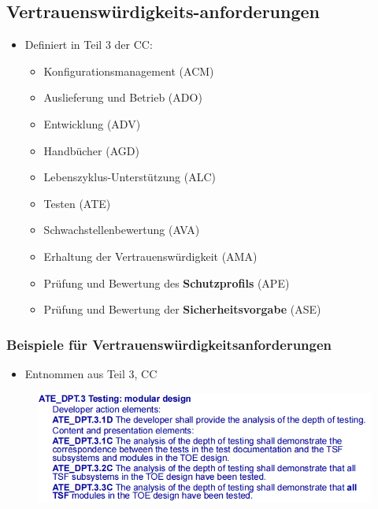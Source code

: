 \documentclass[openany]{book}
\begin{document}
\subsection{Vertrauenswürdigkeits-anforderungen}

\begin{itemize}
    \item Definiert in Teil 3 der CC:
    \begin{itemize}
        \item Konfigurationsmanagement (ACM)
        \item Auslieferung und Betrieb (ADO)
        \item Entwicklung (ADV)
        \item Handbücher (AGD)
        \item Lebenszyklus-Unterstützung (ALC)
        \item Testen (ATE)
        \item Schwachstellenbewertung (AVA)
        \item Erhaltung der Vertrauenswürdigkeit (AMA)\\
        \item Prüfung und Bewertung des \textbf{Schutzprofils} (APE)
        \item Prüfung und Bewertung der \textbf{Sicherheitsvorgabe} (ASE)
    \end{itemize}
\end{itemize}

\subsubsection{Beispiele für Vertrauenswürdigkeitsanforderungen}

\begin{itemize}
    \item Entnommen aus Teil 3, CC
\end{itemize}

\begin{figure}[h!]
    \centering
    \includegraphics[width=\linewidth]{Pics/ATE_DPT3.PNG}
\end{figure}
\end{document}
